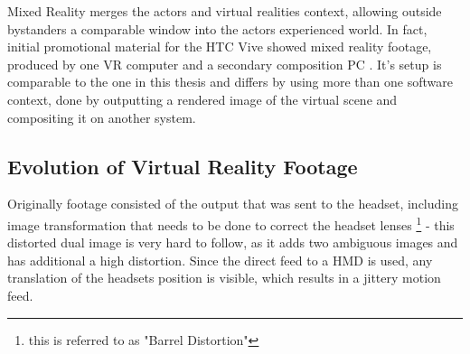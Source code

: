 
Mixed Reality merges the actors and virtual realities context, allowing outside 
bystanders a comparable window into the actors experienced world. In fact, 
initial promotional material for the HTC Vive showed mixed reality footage, 
produced by one VR computer and a secondary composition PC 
\cite{valve:mr-production:2016}. It's setup is comparable to the one in this 
thesis and differs by using more than one software context, done by outputting 
a rendered image of the virtual scene and compositing it on another system.

\subsection{Evolution of Virtual Reality Footage}

Originally footage consisted of the output that was sent to the headset, 
including image transformation that needs to be done to correct the headset 
lenses \footnote{this is referred to as "Barrel Distortion"} - this distorted 
dual image is very hard to follow, as it adds two ambiguous images and has 
additional a high distortion. Since the direct feed to a HMD is used, any 
translation of the headsets position is visible, which results in a jittery 
motion feed.


